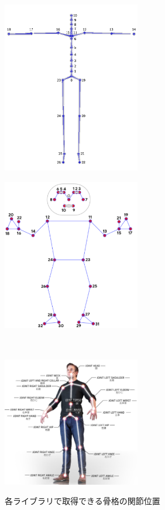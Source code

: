 \documentclass[a4j, fleqn, 12pt]{jsreport}
\begin{document}
\begin{figure}[t]
  \centering
  \begin{minipage}[]{0.45\hsize}
    \centering
    \includegraphics[width=6cm]{img/TechSpec_02.png}
    \label{mocopi}
  \end{minipage}
  \begin{minipage}[]{0.45\hsize}
    \centering
    \includegraphics[width=6cm]{img/media.png}
    \label{RGB}
  \end{minipage}\\
  \begin{minipage}[]{0.45\hsize}
    \centering
    \includegraphics[width=6cm]{img/nuitrack.png}
    \label{RGBD}
  \end{minipage}
  \caption{各ライブラリで取得できる骨格の関節位置}
  \label{sokutei}
\end{figure}
\end{document}
